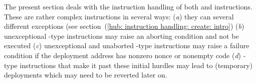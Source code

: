 The present section deals with the instruction handling of both  and  instructions. These are rather complex instructions in several ways:
(\emph{a}) they can several different exceptions (see section~(\ref{hub: instruction handling: create: intro})
(\emph{b}) unexceptional -type instructions may raise an aborting condition and not be executed
(\emph{c}) unexceptional and unaborted -type instructions may raise a failure condition if the deployment address has nonzero nonce or nonempty code
(\emph{d}) -type instructions that make it past these initial hurdles may lead to (temporary) deployments which may need to be reverted later on.
